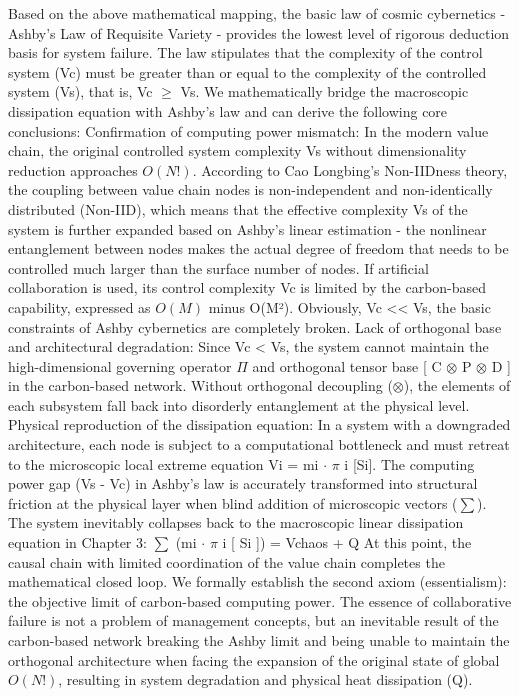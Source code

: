 \documentclass[11pt,a4paper]{article}
\begin{document}
Based on the above mathematical mapping, the basic law of cosmic cybernetics - Ashby's Law of Requisite Variety - provides the lowest level of rigorous deduction basis for system failure. The law stipulates that the complexity of the control system (Vc) must be greater than or equal to the complexity of the controlled system (Vs), that is, Vc $\ge$ Vs. We mathematically bridge the macroscopic dissipation equation with Ashby's law and can derive the following core conclusions: Confirmation of computing power mismatch: In the modern value chain, the original controlled system complexity Vs without dimensionality reduction approaches $O(N!)$. According to Cao Longbing's Non-IIDness theory, the coupling between value chain nodes is non-independent and non-identically distributed (Non-IID), which means that the effective complexity Vs of the system is further expanded based on Ashby's linear estimation - the nonlinear entanglement between nodes makes the actual degree of freedom that needs to be controlled much larger than the surface number of nodes. If artificial collaboration is used, its control complexity Vc is limited by the carbon-based capability, expressed as $O(M)$ minus O(M²). Obviously, Vc << Vs, the basic constraints of Ashby cybernetics are completely broken. Lack of orthogonal base and architectural degradation: Since Vc < Vs, the system cannot maintain the high-dimensional governing operator $\Pi$ and orthogonal tensor base [ C $\otimes$ P $\otimes$ D ] in the carbon-based network. Without orthogonal decoupling ($\otimes$), the elements of each subsystem fall back into disorderly entanglement at the physical level. Physical reproduction of the dissipation equation: In a system with a downgraded architecture, each node is subject to a computational bottleneck and must retreat to the microscopic local extreme equation Vi = mi $\cdot$ $\pi$ i [Si]. The computing power gap (Vs - Vc) in Ashby's law is accurately transformed into structural friction at the physical layer when blind addition of microscopic vectors ($\sum$). The system inevitably collapses back to the macroscopic linear dissipation equation in Chapter 3: $\sum$ (mi $\cdot$ $\pi$ i [ Si ]) = Vchaos + Q At this point, the causal chain with limited coordination of the value chain completes the mathematical closed loop. We formally establish the second axiom (essentialism): the objective limit of carbon-based computing power. The essence of collaborative failure is not a problem of management concepts, but an inevitable result of the carbon-based network breaking the Ashby limit and being unable to maintain the orthogonal architecture when facing the expansion of the original state of global $O(N!)$, resulting in system degradation and physical heat dissipation (Q).
\end{document}
